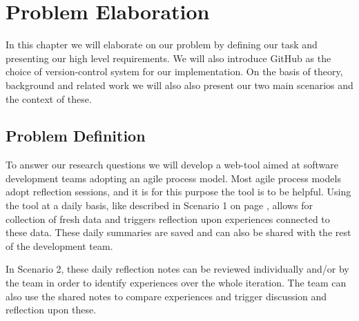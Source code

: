 \chapter{Problem Elaboration}
\label{chap:problemelaboration}
%
%
\label{problemelaboration}
In this chapter we will elaborate on our problem by defining our task and presenting our high level requirements. We will also introduce GitHub as the choice of version-control system for our implementation.
On the basis of theory, background and related work we will also also present our two main scenarios and the context of these. 


\section{Problem Definition}
\label{problemdefinition}

To answer our research questions we will develop a web-tool aimed at software development teams adopting an agile process model. Most agile process models adopt reflection sessions, and it is for this purpose the tool is to be helpful. Using the tool at a daily basis, like described in Scenario 1 on page \pageref{scenario1}, allows for collection of fresh data and triggers reflection upon experiences connected to these data. These daily summaries are saved and can also be shared with the rest of the development team. 

In Scenario 2, these daily reflection notes can be reviewed individually and/or by the team in order to identify experiences over the whole iteration. The team can also use the shared notes to compare experiences and trigger discussion and reflection upon these. 

